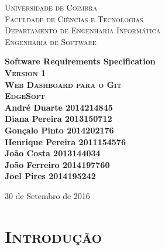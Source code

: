 \documentclass[12pt]{article}
\begin{document}
 
\begin{titlepage}
\begin{center}

\textsc{\footnotesize Universidade de Coimbra }\\[0.1cm]
\textsc{\footnotesize Faculdade de Ciências e Tecnologias}  \\[0.1cm]
\textsc{\footnotesize Departamento de Engenharia Informática }\\[0.2cm]
\textsc{\footnotesize Engenharia de Software }\\[2cm]




{\Large \bfseries Software Requirements Specification\\[1.5cm]

\textsc{\normalsize Version 1}\\[.2cm]
\textsc{\normalsize Web Dashboard para o Git}\\[2cm]
\textsc{\fontsize{2cm}{2.5cm}\selectfont EdgeSoft}\\[5cm]


\small
André Duarte \hfill 2014214845\\ 
Diana Pereira \hfill 2013150712\\
Gonçalo Pinto \hfill 2014202176\\
Henrique Pereira \hfill 2011154576\\
João Costa \hfill 2013144034\\
João Ferreiro \hfill 2014197760\\
Joel Pires \hfill 2014195242\\



\begin{minipage}{0\textwidth}
\begin{flushright} \large
\end{flushright}
\end{minipage}

\vfill
{\normalsize 30 de Setembro de 2016}
}

\end{center}
\end{titlepage}


\pagebreak

\tableofcontents

\pagebreak

\section{ \textsc{Introdução}}
\end{document}
